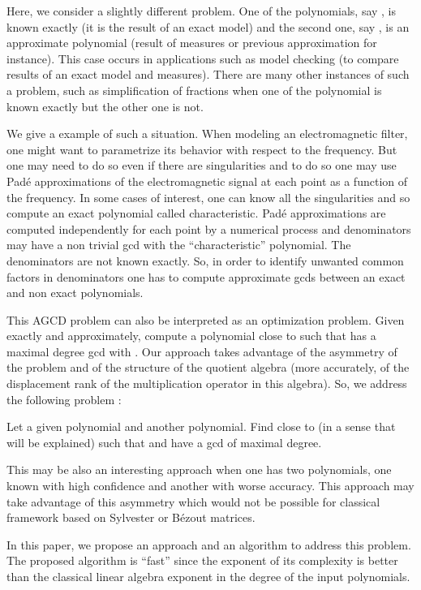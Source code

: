 \documentclass{article}
\begin{document}
Here, we consider a slightly different problem. One of the polynomials, say
, is known exactly (it is the result of an exact model) and the second one,
say , is an approximate polynomial (result of measures or previous
approximation for instance). This case occurs in applications such as model
checking (to compare results of an exact model and measures). There are many
other instances of such a problem, such as simplification of fractions when
one of the polynomial is known exactly but the other one is not.

We give a example of such a situation. When modeling an electromagnetic
filter, one might want to parametrize its behavior with respect to the
frequency. But one may need to do so even if there are singularities and to do
so one may use Pad\'e approximations of the electromagnetic signal at each
point as a function of the frequency. In some cases of interest, one can know
all the singularities and so compute an exact polynomial called
characteristic. Pad\'e approximations are computed independently for each
point by a numerical process and denominators may have a non trivial gcd with
the ``characteristic'' polynomial. The denominators are not known exactly. So,
in order to identify unwanted common factors in denominators one has to
compute approximate gcds between an exact and non exact polynomials.

This AGCD problem can also be interpreted as an optimization problem. Given
 exactly and  approximately, compute a polynomial  close to
 such that  has a maximal degree gcd with . Our approach
takes advantage of the asymmetry of the problem and of the structure of the
quotient algebra  (more accurately, of the
displacement rank of the multiplication operator in this algebra). So, we
address the following problem :



\begin{problem}
  Let  a given polynomial and  another
  polynomial. Find  close to  (in a sense that will be
  explained) such that  and  have a gcd of maximal
  degree. \ 
\end{problem}

This may be also an interesting approach when one has two polynomials, one
known with high confidence and another with worse accuracy. This approach may
take advantage of this asymmetry which would not be possible for classical
framework based on Sylvester or B\'ezout matrices.



In this paper, we propose an approach and an algorithm to address this
problem. The proposed algorithm is ``fast'' since the exponent of its
complexity is better than the classical linear algebra exponent in the degree
of the input polynomials.
\end{document}
